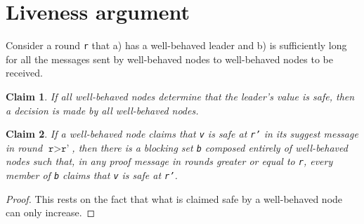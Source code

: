\documentclass[11pt]{article}
\newtheorem{claim}{Claim}
\begin{document}
\section{Liveness argument}

Consider a round \texttt{r} that a) has a well-behaved leader and b) is
sufficiently long for all the messages sent by well-behaved nodes to
well-behaved nodes to be received.

\begin{claim}
  \label{claim:if_safe_then_termination}
  If all well-behaved nodes determine that the leader's value is safe, then a
  decision is made by all well-behaved nodes.
\end{claim}

\begin{claim}
  \label{claim:blocking_claims_safe}
  If a well-behaved node claims that \texttt{v} is safe at \texttt{r'} in its suggest message in round $\texttt{r}> \texttt{r'}$, then there is a blocking set \texttt{b} composed entirely of well-behaved nodes such that, in any \textit{proof} message in rounds greater or equal to \texttt{r}, every member of \texttt{b} claims that \texttt{v} is safe at \texttt{r'}.
\end{claim}
\begin{proof}
  This rests on the fact that what is claimed safe by a well-behaved node can only increase.
\end{proof}
\end{document}
